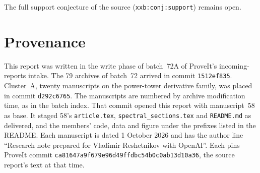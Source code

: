 \documentclass[11pt,a4paper]{article}
\numberwithin{equation}{section}
\begin{document}
The full support conjecture of the source (\texttt{xxb:conj:support}) remains open.

\section{Provenance}\label{aud:sec:provenance}
This report was written in the write phase of batch~72A of ProveIt's incoming-reports intake. The 79 archives of batch~72 arrived in commit \texttt{1512ef835}. Cluster~A, twenty manuscripts on the power-tower derivative family, was placed in commit \texttt{d292c6765}. The manuscripts are numbered by archive modification time, as in the batch index. That commit opened this report with manuscript~58 as base. It staged 58's \texttt{article.tex}, \texttt{spectral\_sections.tex} and \texttt{README.md} as delivered, and the members' code, data and figure under the prefixes listed in the README. Each manuscript is dated 1 October 2026 and has the author line ``Research note prepared for Vladimir Reshetnikov with OpenAI''. Each pins ProveIt commit \texttt{ca81647a9f679e96d49ffdbc54b0c0ab13d10a36}, the source report's text at that time.
\end{document}
